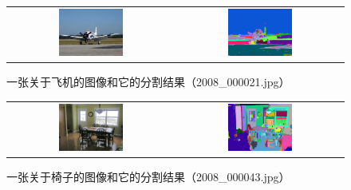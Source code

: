 \documentclass[a4paper, 12pt, UTF8]{article}
\begin{document}
\begin{figure}[h!]
    \centering
    \begin{tabular}{cc}
        \includegraphics[width=0.4\textwidth]{src/images/2008_000021.jpg} &
        \includegraphics[width=0.4\textwidth]{src/images/2008_000021_output.jpg}
    \end{tabular}
    \caption{一张关于飞机的图像和它的分割结果（2008\_000021.jpg）}
    \label{figure_aeroplane}
\end{figure}

\begin{figure}[h!]
    \centering
    \begin{tabular}{cc}
        \includegraphics[width=0.4\textwidth]{src/images/2008_000043.jpg} &
        \includegraphics[width=0.4\textwidth]{src/images/2008_000043_output.jpg}
    \end{tabular}
    \caption{一张关于椅子的图像和它的分割结果（2008\_000043.jpg）}
    \label{figure_chair}
\end{figure}
\end{document}
